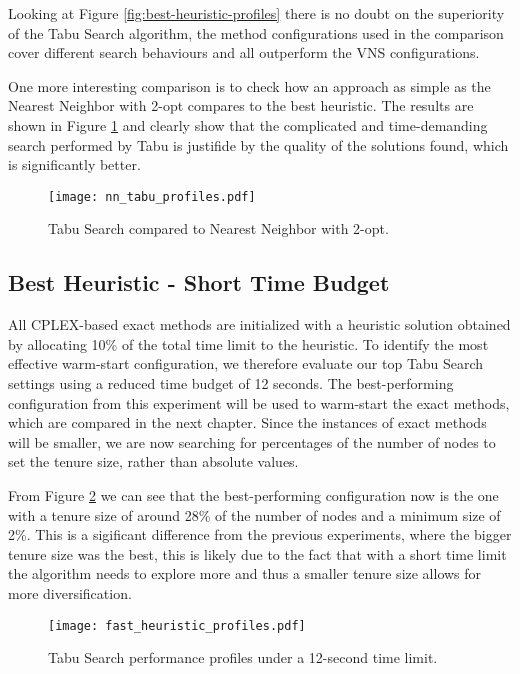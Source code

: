 Looking at Figure \ref{fig:best-heuristic-profiles} there is no doubt on the superiority of the Tabu Search algorithm, the method configurations used in the comparison cover different search behaviours and all outperform the VNS configurations.

One more interesting comparison is to check how an approach as simple as the Nearest Neighbor with 2-opt compares to the best heuristic. The results are shown in Figure \ref{fig:nn-vs-best-heuristic} and clearly show that the complicated and time-demanding search performed by Tabu is justifide by the quality of the solutions found, which is significantly better.

\begin{figure}[H]
  \centering
  \texttt{[image: nn\_tabu\_profiles.pdf]}
  \caption{Tabu Search compared to Nearest Neighbor with 2-opt.}
  \label{fig:nn-vs-best-heuristic}
\end{figure}

\subsection{Best Heuristic - Short Time Budget}
\label{ssec:short-heuristic}
All CPLEX-based exact methods are initialized with a heuristic solution obtained by allocating 10\% of the total time limit to the heuristic. To identify the most effective warm-start configuration, we therefore evaluate our top Tabu Search settings using a reduced time budget of 12 seconds. The best-performing configuration from this experiment will be used to warm-start the exact methods, which are compared in the next chapter. Since the instances of exact methods will be smaller, we are now searching for percentages of the number of nodes to set the tenure size, rather than absolute values.

From Figure \ref{fig:fast-heuristic} we can see that the best-performing configuration now is the one with a tenure size of around 28\% of the number of nodes and a minimum size of 2\%. This is a sigificant difference from the previous experiments, where the bigger tenure size was the best, this is likely due to the fact that with a short time limit the algorithm needs to explore more and thus a smaller tenure size allows for more diversification.

\begin{figure}[H]
  \centering
  \texttt{[image: fast\_heuristic\_profiles.pdf]}
  \caption{Tabu Search performance profiles under a 12-second time limit.}
  \label{fig:fast-heuristic}
\end{figure}

